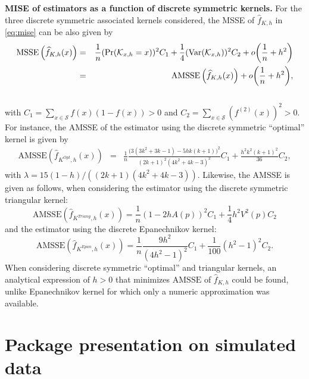 \textbf{MISE of estimators as a function of discrete symmetric kernels.} For the three discrete symmetric associated kernels considered, the MSSE of \(\widehat{f}_{K,h}\) in \eqref{eq:mise} can be also given by
\begin{eqnarray*}\label{eq_2:mise}
\mathrm{MSSE}\left (\widehat{f}_{K,h}(x)\right )
&=&\frac{1}{n}(\Pr(\mathcal{K}_{x,h}=x))^{2}C_{1}+ \frac{1}{4}(\text{Var}(\mathcal{K}_{x,h}) )^{2}C_{2} + o\bigg(\frac{1}{n} + h^{2} \bigg)\\
&=&\mathrm{AMSSE}\left (\widehat{f}_{K,h}(x)\right ) + o\bigg(\frac{1}{n} + h^{2} \bigg),\notag
\end{eqnarray*}\\
with \(C_{1}=\sum_{x\in\mathcal{S}}f(x)(1-f(x))>0\) and \(C_{2}=\sum_{x\in\mathcal{S}}(f^{(2)}(x))^{2}>0\).
For instance, the AMSSE of the estimator using the discrete symmetric ``optimal'' kernel is given by
\begin{eqnarray*}\label{eq:amise_Kopt}
\mathrm{AMSSE}\left (\widehat{f}_{K^{Opt},h}(x)\right )
&=&\frac{1}{n}\frac{\big(3(3k^2+3k-1) - 5hk(k+1)\big)^{2}}{(2k+1)^{2}(4k^{2}+4k-3)^{2}}C_{1}+ \frac{h^{2}k^{2}(k+1)^{2}}{36}C_{2}, 
\end{eqnarray*}
with \(\lambda=15(1-h)/((2k+1)(4k^{2}+4k-3))\).
Likewise, the AMSSE is given as follows, when considering the estimator using the discrete symmetric triangular kernel:
\begin{equation*}\label{eq:amise_Ktriang}
\mathrm{AMSSE}\left (\widehat{f}_{K^{Triang},h}(x)\right )=\frac{1}{n}\left(1-2hA(p)\right)^{2}C_{1}+ \frac{1}{4}h^{2}V^{2}(p)C_{2}
\end{equation*}
and the estimator using the discrete Epanechnikov kernel:
\[\mathrm{AMSSE}\left (\widehat{f}_{K^{Epan},h}(x)\right )=\frac{1}{n}\frac{9h^{2}}{(4h^{2}-1)^{2}}C_{1}+ \frac{1}{100}(h^{2}-1)^{2}C_{2}.\]
When considering discrete symmetric ``optimal'' and triangular kernels, an analytical expression of \(h>0\) that minimizes \(\mathrm{AMSSE}\) of \(\widehat{f}_{K,h}\) could be found, unlike Epanechnikov kernel for which only a numeric approximation was available.

\section{Package presentation on simulated data}\label{sec4-presentation-simu}

